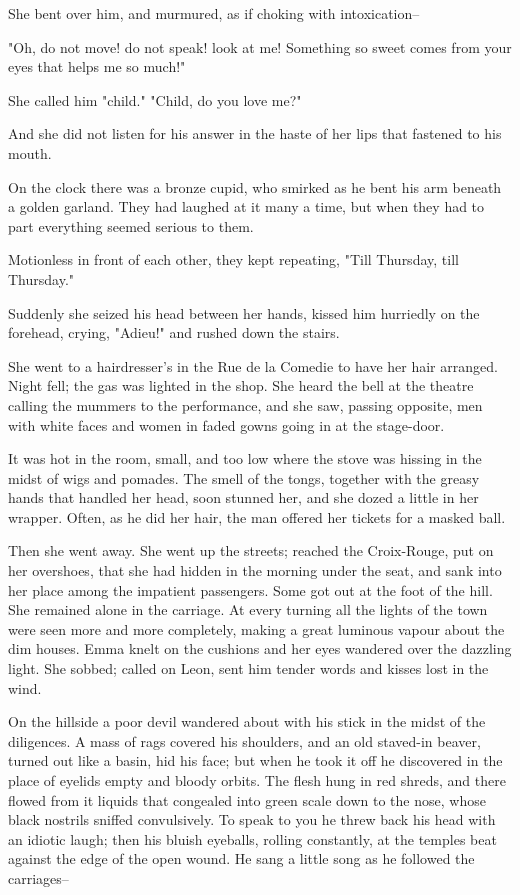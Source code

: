 \documentclass[11pt,twocolumn]{ltugboat}
\begin{document}
She bent over him, and murmured, as if choking with intoxication--

"Oh, do not move! do not speak! look at me! Something so sweet comes
from your eyes that helps me so much!"

She called him "child." "Child, do you love me?"

And she did not listen for his answer in the haste of her lips that
fastened to his mouth.

On the clock there was a bronze cupid, who smirked as he bent his arm
beneath a golden garland. They had laughed at it many a time, but when
they had to part everything seemed serious to them.

Motionless in front of each other, they kept repeating, "Till Thursday,
till Thursday."

Suddenly she seized his head between her hands, kissed him hurriedly on
the forehead, crying, "Adieu!" and rushed down the stairs.

She went to a hairdresser's in the Rue de la Comedie to have her hair
arranged. Night fell; the gas was lighted in the shop. She heard the
bell at the theatre calling the mummers to the performance, and she saw,
passing opposite, men with white faces and women in faded gowns going in
at the stage-door.

It was hot in the room, small, and too low where the stove was hissing
in the midst of wigs and pomades. The smell of the tongs, together with
the greasy hands that handled her head, soon stunned her, and she dozed
a little in her wrapper. Often, as he did her hair, the man offered her
tickets for a masked ball.

Then she went away. She went up the streets; reached the Croix-Rouge,
put on her overshoes, that she had hidden in the morning under the seat,
and sank into her place among the impatient passengers. Some got out
at the foot of the hill. She remained alone in the carriage. At every
turning all the lights of the town were seen more and more completely,
making a great luminous vapour about the dim houses. Emma knelt on the
cushions and her eyes wandered over the dazzling light. She sobbed;
called on Leon, sent him tender words and kisses lost in the wind.

On the hillside a poor devil wandered about with his stick in the midst
of the diligences. A mass of rags covered his shoulders, and an old
staved-in beaver, turned out like a basin, hid his face; but when he
took it off he discovered in the place of eyelids empty and bloody
orbits. The flesh hung in red shreds, and there flowed from it liquids
that congealed into green scale down to the nose, whose black nostrils
sniffed convulsively. To speak to you he threw back his head with an
idiotic laugh; then his bluish eyeballs, rolling constantly, at the
temples beat against the edge of the open wound. He sang a little song
as he followed the carriages--
\end{document}
